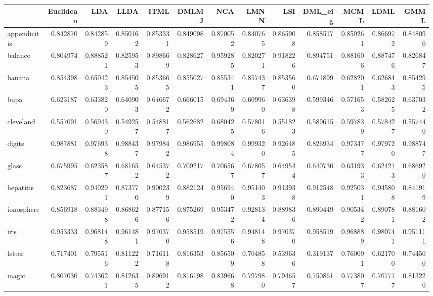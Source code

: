 \begin{tabular}{lrrrrrrrrrrrr}
\toprule
{} &  Euclidean &       LDA &      LLDA &      ITML &     DMLMJ &       NCA &      LMNN &       LSI &   DML\_eig &      MCML &      LDML &      GMML \\
\midrule
appendicitis    &   0.842870 &  0.842859 &  0.850162 &  0.853331 &  0.849098 &  0.870052 &  0.840765 &  0.865908 &  0.858517 &  0.850261 &  0.866972 &  0.848090 \\
balance         &   0.804974 &  0.888521 &  0.825953 &  0.898669 &  0.828627 &  0.959285 &  0.820271 &  0.918226 &  0.894751 &  0.881606 &  0.887476 &  0.826847 \\
banana          &   0.854398 &  0.650423 &  0.854505 &  0.853665 &  0.855027 &  0.855341 &  0.857437 &  0.853560 &  0.671899 &  0.628201 &  0.626843 &  0.854295 \\
bupa            &   0.623187 &  0.633820 &  0.640903 &  0.646672 &  0.666015 &  0.694369 &  0.609960 &  0.636398 &  0.599346 &  0.571653 &  0.582625 &  0.637032 \\
cleveland       &   0.557091 &  0.569430 &  0.549257 &  0.548817 &  0.562682 &  0.680425 &  0.578016 &  0.551823 &  0.589615 &  0.597839 &  0.578427 &  0.557440 \\
digits          &   0.987881 &  0.976938 &  0.988437 &  0.979842 &  0.986955 &  0.998084 &  0.999320 &  0.926485 &  0.826934 &  0.973477 &  0.979720 &  0.988747 \\
glass           &   0.675995 &  0.623587 &  0.681652 &  0.645372 &  0.709217 &  0.706567 &  0.678057 &  0.649544 &  0.640730 &  0.631933 &  0.624213 &  0.686920 \\
hepatitis       &   0.823687 &  0.940291 &  0.873770 &  0.900239 &  0.882124 &  0.956940 &  0.951403 &  0.913938 &  0.912548 &  0.925031 &  0.945808 &  0.841919 \\
ionosphere      &   0.856918 &  0.883498 &  0.868626 &  0.877156 &  0.875269 &  0.953472 &  0.928134 &  0.889836 &  0.890449 &  0.905342 &  0.890781 &  0.881602 \\
iris            &   0.953333 &  0.968148 &  0.961481 &  0.970370 &  0.958519 &  0.975556 &  0.948148 &  0.970370 &  0.958519 &  0.968889 &  0.980741 &  0.951111 \\
letter          &   0.717401 &  0.795516 &  0.811222 &  0.716118 &  0.816353 &  0.856509 &  0.704858 &  0.539636 &  0.319137 &  0.760091 &  0.621700 &  0.744500 \\
magic           &   0.807030 &  0.743621 &  0.812635 &  0.806912 &  0.816198 &  0.839668 &  0.797980 &  0.794657 &  0.750861 &  0.773807 &  0.707717 &  0.813220 \\

\end{tabular}
